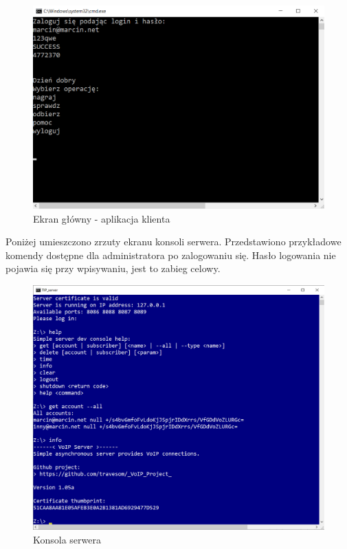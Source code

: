 \documentclass[12pt,a4paper]{article}
\begin{document}
	\begin{figure}[h!]
		\begin{center}
			\includegraphics*[width=.9\textwidth]{main_screen.png}
		\end{center}
		\caption{Ekran główny - aplikacja klienta}
	\end{figure}
	\pagebreak
	
	\par Poniżej umieszczono zrzuty ekranu konsoli serwera. Przedstawiono przykładowe komendy dostępne dla administratora po zalogowaniu się. Hasło logowania nie pojawia się przy wpisywaniu, jest to zabieg celowy.
	\begin{figure}[h!]
		\begin{center}
			\includegraphics*[width=.9\textwidth]{serwer_1.png}
		\end{center}
		\caption{Konsola serwera}
	\end{figure}
	
\end{document}
